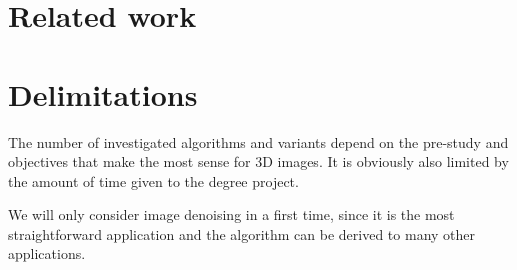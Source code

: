 \section{Related work}



\section{Delimitations}

The number of investigated algorithms and variants depend on the pre-study and objectives that make the most sense for 3D images.
It is obviously also limited by the amount of time given to the degree project.

We will only consider image denoising in a first time, since it is the most straightforward application and the algorithm can be derived to many other applications.
